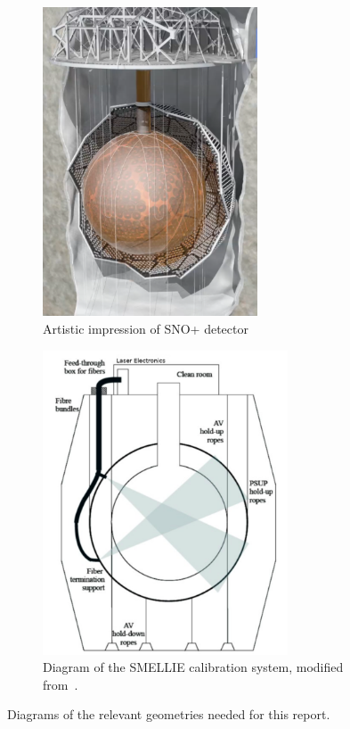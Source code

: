 \begin{figure}
    \centering
    \begin{subfigure}{0.48\textwidth}
        \centering
        \includegraphics[width=0.7\textwidth]{images/detector_picture.png}
        \caption{Artistic impression of SNO+ detector~\cite{albanese_sno_2021}}
        \label{fig:detector_pic}
    \end{subfigure}
    \begin{subfigure}{0.48\textwidth}
        \centering
        \includegraphics[width=0.8\textwidth]{images/SMELLIE_picture_corrected.png}
        \caption{Diagram of the SMELLIE calibration system, modified from~\cite{lebanowski_sno_2020}.}
        \label{fig:smellie_diagram}
    \end{subfigure}
    \caption{Diagrams of the relevant geometries needed for this report.}
    \label{fig:diagrams}
\end{figure}